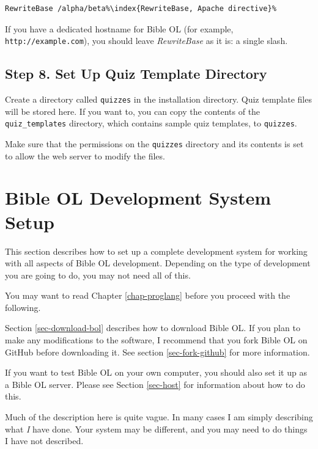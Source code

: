 \documentclass[11pt,oneside,a4paper]{memoir}
\begin{document}
\begin{lstlisting}
RewriteBase /alpha/beta%\index{RewriteBase, Apache directive}%
\end{lstlisting}

If you have a dedicated hostname for Bible OL (for example, \texttt{http://example.com}), you should
leave \emph{RewriteBase} as it is: a single slash.

\subsection{Step 8. Set Up Quiz Template Directory}

Create a directory called \texttt{quizzes} in the installation directory. Quiz template files will
be stored here. If you want to, you can copy the contents of the \texttt{quiz\_templates} directory,
which contains sample quiz templates, to \texttt{quizzes}.

Make sure that the permissions on the \texttt{quizzes} directory and its contents is set to allow
the web server to modify the files.

\section{Bible OL Development System Setup}\label{sec-devel}

This section describes how to set up a complete development system for working with all aspects of
Bible OL development. Depending on the type of development you are going to do, you may not need all
of this.

You may want to read Chapter \ref{chap-proglang} before you proceed with the following.

Section \ref{sec-download-bol} describes how to download Bible OL. If you plan to make any
modifications to the software, I recommend that you fork Bible OL on GitHub
before downloading it. See section \ref{sec-fork-github} for more information.

If you want to test Bible OL on your own computer, you should also set it up as a Bible OL server.
Please see Section \ref{sec-host} for information about how to do this.

Much of the description here is quite vague. In many cases I am simply describing what \emph{I} have
done. Your system may be different, and you may need to do things I have not described.
\end{document}
